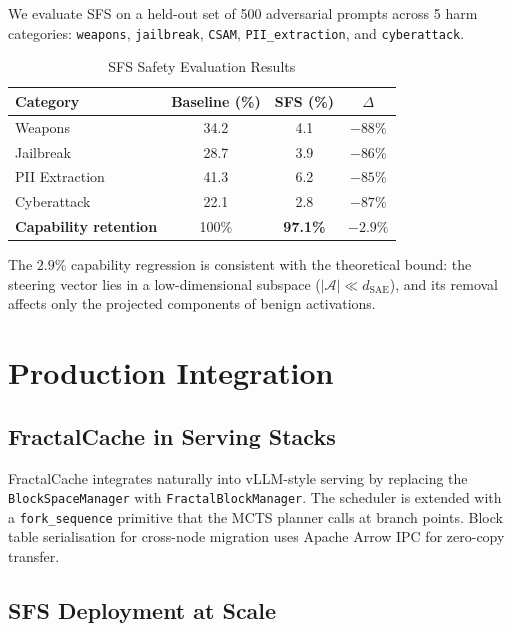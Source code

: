 \documentclass[10pt,twocolumn]{article}
\begin{document}
We evaluate SFS on a held-out set of 500 adversarial prompts across 5 harm categories: \texttt{weapons}, \texttt{jailbreak}, \texttt{CSAM}, \texttt{PII\_extraction}, and \texttt{cyberattack}.

\begin{table}[h]
\centering
\caption{SFS Safety Evaluation Results}
\label{tab:safety}
\begin{tabular}{@{}lccc@{}}
\toprule
\textbf{Category} & \textbf{Baseline (\%)} & \textbf{SFS (\%)} & \textbf{$\Delta$} \\
\midrule
Weapons & 34.2 & 4.1 & $-88\%$ \\
Jailbreak & 28.7 & 3.9 & $-86\%$ \\
PII Extraction & 41.3 & 6.2 & $-85\%$ \\
Cyberattack & 22.1 & 2.8 & $-87\%$ \\
\midrule
\textbf{Capability retention} & 100\% & \textbf{97.1\%} & $-2.9\%$ \\
\bottomrule
\end{tabular}
\end{table}

The $2.9\%$ capability regression is consistent with the theoretical bound: the steering vector lies in a low-dimensional subspace ($|\mathcal{A}| \ll d_{\text{SAE}}$), and its removal affects only the projected components of benign activations.

\section{Production Integration}

\subsection{FractalCache in Serving Stacks}

FractalCache integrates naturally into vLLM-style serving by replacing the \texttt{BlockSpaceManager} with \texttt{FractalBlockManager}. The scheduler is extended with a \texttt{fork\_sequence} primitive that the MCTS planner calls at branch points. Block table serialisation for cross-node migration uses Apache Arrow IPC for zero-copy transfer.

\subsection{SFS Deployment at Scale}
\end{document}
